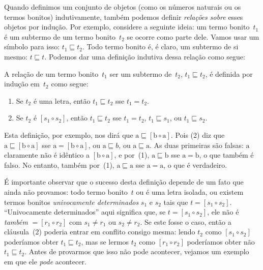 \documentclass[../../../include/open-logic-section]{subfiles}
\begin{document}


Quando definimos um conjunto de objetos (como os números naturais ou
os termos bonitos) indutivamente, também podemos definir \emph{relações sobre}
esses objetos por indução.  Por exemplo, considere a seguinte
ideia: um termo bonito~$t_1$ é um subtermo de um termo bonito~$t_2$ se ocorre como
parte dele.  Vamos usar um símbolo para isso: $t_1 \sqsubseteq t_2$. Todo
termo bonito é, é claro, um subtermo de si mesmo: $t \sqsubseteq t$. Podemos
dar uma definição indutiva dessa relação como segue:

\begin{defn}
  A relação de um termo bonito~$t_1$ ser um subtermo de~$t_2$, $t_1
  \sqsubseteq t_2$, é definida por indução em~$t_2$ como segue:
  \begin{enumerate}
  \item Se $t_2$ é uma letra, então $t_1 \sqsubseteq t_2$ sse $t_1 = t_2$.
  \item Se $t_2$ é $[s_1 \circ s_2]$, então $t_1 \sqsubseteq t_2$ sse $t_1 =
    t_2$, $t_1 \sqsubseteq s_1$, ou $t_1 \sqsubseteq s_2$.
  \end{enumerate}
\end{defn}

Esta definição, por exemplo, nos dirá que $\mathrm{a}
\sqsubseteq [\mathrm{b} \circ \mathrm{a}]$. Pois (2) diz que
$\mathrm{a} \sqsubseteq [\mathrm{b} \circ \mathrm{a}]$ sse $\mathrm{a}
= [\mathrm{b} \circ \mathrm{a}]$, ou $\mathrm{a} \sqsubseteq b$, ou
$\mathrm{a} \sqsubseteq \mathrm{a}$. As duas primeiras são falsas:
$\mathrm{a}$ claramente não é idêntico a $[\mathrm{b} \circ
  \mathrm{a}]$, e por~(1), $\mathrm{a} \sqsubseteq \mathrm{b}$ sse
$\mathrm{a} = \mathrm{b}$, o que também é falso. No entanto, também por~(1),
$\mathrm{a} \sqsubseteq \mathrm{a}$ sse $\mathrm{a} = \mathrm{a}$,
o que é verdadeiro.

É importante observar que o sucesso desta definição depende de
um fato que ainda não provamos: todo termo bonito~$t$ ou é uma
letra isolada, ou existem termos bonitos \emph{univocamente determinados}
$s_1$ e $s_2$ tais que $t = [s_1 \circ s_2]$.  ``Univocamente
determinados'' aqui significa que, se $t = [s_1 \circ s_2]$, ele não é
\emph{também} $= [r_1 \circ r_2]$ com $s_1 \neq r_1$ ou $s_2 \neq r_2$.
Se este fosse o caso, então a cláusula~(2) poderia entrar em conflito
consigo mesma: lendo $t_2$ como $[s_1 \circ s_2]$ poderíamos obter $t_1
\sqsubseteq t_2$, mas se lermos $t_2$ como $[r_1 \circ r_2]$ poderíamos
obter não $t_1 \sqsubseteq t_2$.  Antes de provarmos que isso não pode
acontecer, vejamos um exemplo em que ele \emph{pode} acontecer.
\end{document}
